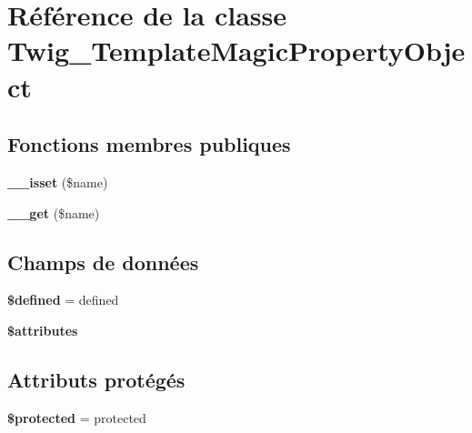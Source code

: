\hypertarget{class_twig___template_magic_property_object}{}\section{Référence de la classe Twig\+\_\+\+Template\+Magic\+Property\+Object}
\label{class_twig___template_magic_property_object}
\subsection*{Fonctions membres publiques}
\begin{DoxyCompactItemize}
\item 
{\bfseries \+\_\+\+\_\+isset} (\$name)\hypertarget{class_twig___template_magic_property_object_a8f132f051b7cd7d570ccb9f6e2bb4201}{}\label{class_twig___template_magic_property_object_a8f132f051b7cd7d570ccb9f6e2bb4201}

\item 
{\bfseries \+\_\+\+\_\+get} (\$name)\hypertarget{class_twig___template_magic_property_object_abc8e9e31bb15c8a44c3210ec551407c8}{}\label{class_twig___template_magic_property_object_abc8e9e31bb15c8a44c3210ec551407c8}

\end{DoxyCompactItemize}
\subsection*{Champs de données}
\begin{DoxyCompactItemize}
\item 
{\bfseries \$defined} = \textquotesingle{}defined\textquotesingle{}\hypertarget{class_twig___template_magic_property_object_a7037630c65a50821a29f3045e390465e}{}\label{class_twig___template_magic_property_object_a7037630c65a50821a29f3045e390465e}

\item 
{\bfseries \$attributes}
\end{DoxyCompactItemize}
\subsection*{Attributs protégés}
\begin{DoxyCompactItemize}
\item 
{\bfseries \$protected} = \textquotesingle{}protected\textquotesingle{}\hypertarget{class_twig___template_magic_property_object_a2b7c879294b290c4a388522ce49a08d6}{}\label{class_twig___template_magic_property_object_a2b7c879294b290c4a388522ce49a08d6}

\end{DoxyCompactItemize}


